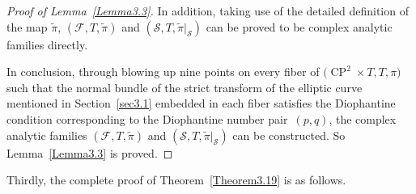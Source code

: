 \documentclass[pdftex]{sigma}
\numberwithin{equation}{section}
\begin{document}
\begin{proof}[Proof of Lemma~\ref{Lemma3.3}]
In addition, taking use of the detailed definition of the map $\widetilde{\pi}$, $(\mathcal{F},T, \widetilde{\pi})$ and $(\mathcal{S},T, \widetilde{\pi}|_\mathcal{S})$ can be proved to be complex analytic families directly.

In conclusion, through blowing up nine points on every fiber of $\bigl(\operatorname{CP}^2 \times T,T, \pi\bigr)$ such that the normal bundle of the strict transform of the elliptic curve mentioned in Section~\ref{sec3.1} embedded in each fiber satisfies the Diophantine condition corresponding to the Diophantine number pair~$(p,q)$, the complex analytic families $(\mathcal{F},T, \widetilde{\pi})$ and $(\mathcal{S},T, \widetilde{\pi}|_\mathcal{S})$ can be constructed. So Lemma~\ref{Lemma3.3} is proved.
\end{proof}

Thirdly, the complete proof of Theorem~\ref{Theorem3.19} is as follows.
\end{document}
